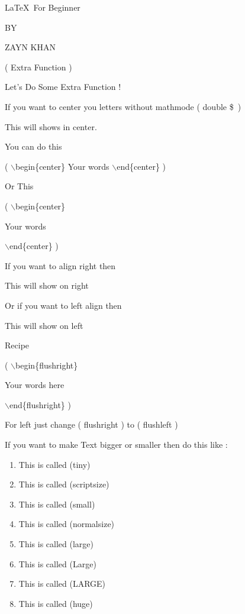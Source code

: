 \documentclass[11pt]{article}
\begin{document}
\begin{center}
\Large \LaTeX\ For Beginner

\small BY

\Large ZAYN KHAN

\large ( Extra Function )
\end{center}


Let's Do Some Extra Function !

If you want to center you letters without mathmode ( double \$\ )

\begin{center}This will shows in center.\end{center} 

You can do this 

 ( $\backslash$begin\{center\} Your words  $\backslash$end\{center\} )
 
 Or This
 
 ( $\backslash$begin\{center\}
 
  Your words 
  
   $\backslash$end\{center\} )

\vspace{1cm}

If you want to align right then

\begin{flushright}
This will show on right
\end{flushright}

\vspace{1cm}

Or if you want to left align then

\begin{flushleft}
This will show on left
\end{flushleft}

Recipe 

( $\backslash$begin\{flushright\}

  Your words here

  $\backslash$end\{flushright\} )
  
  For left just change ( flushright ) to ( flushleft )
  
\vspace{1cm}

If you want to make Text bigger or smaller then do this like :

\begin{enumerate}

\item \tiny{This is called (tiny)}
\item \scriptsize{This is called (scriptsize)}
\item \small{This is called (small)}
\item \normalsize{This is called (normalsize)}
\item \large{This is called (large)}
\item \Large{This is called (Large)}
\item \LARGE{This is called (LARGE)}
\item \huge{This is called (huge)}

\end{enumerate}  
  
\end{document}
